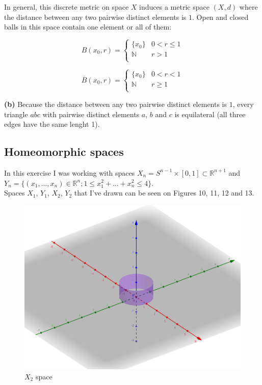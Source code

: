\documentclass[12pt]{article}
\begin{document}
In general, this discrete metric on space $X$ induces a metric space $(X,d)$ where the distance between any two pairwise distinct elements is $1$. Open and closed balls in this space contain one element or all of them:

\begin{equation*}
	B(x_{0}, r) =
	\begin{cases}
		\{x_{0}\} & 0 < r \leq 1\\
		 \mathbb{N} & r > 1\\
	\end{cases}       
\end{equation*}

\begin{equation*}
	\overline{B}(x_{0}, r) =
	\begin{cases}
		\{x_{0}\} & 0 < r < 1\\
		\mathbb{N} & r \geq 1\\
	\end{cases}       
\end{equation*}

\textbf{(b)} Because the distance between any two pairwise distinct elements is $1$, every triangle $abc$ with pairwise distinct elements $a$, $b$ and $c$ is equilateral (all three edges have the same lenght 1).

\subsection{Homeomorphic spaces} 
In this exercise I was working with spaces $X_{n} = S^{n-1} \times [0,1] \subset \mathbb{R}^{n+1}$ and $Y_{n}=\{(x_{1},  ... , x_{n}) \in \mathbb{R}^n; 1 \leq x_{1}^2 + ... + x_{n}^2 \leq 4 \}$. \\

\noindent Spaces $X_{1}$, $Y_{1}$, $X_{2}$, $Y_{2}$ that I've drawn can be seen on Figures 10, 11, 12 and 13. \\

\begin{figure}
	\centering
	\includegraphics[scale=0.40] {graph10}
	\caption{\label{fig:10} $X_{2}$ space}
\end{figure}
\end{document}
